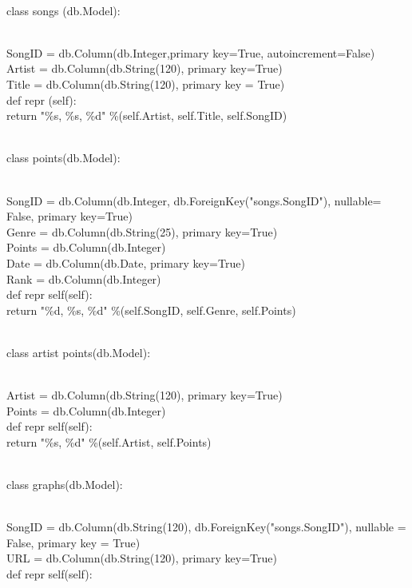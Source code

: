 \documentclass{article}
\begin{document}
\begin{displayquote}
\\ class songs (db.Model):
\begin{displayquote}
\\  SongID = db.Column(db.Integer,primary key=True, autoincrement=False)
\\  Artist = db.Column(db.String(120), primary key=True)
\\  Title = db.Column(db.String(120), primary key = True)
\\  def   repr  (self):
\\    return "\%s, \%s, \%d" \%(self.Artist, self.Title, self.SongID)
\end{displayquote}
\\ class points(db.Model):
\begin{displayquote}
\\  SongID = db.Column(db.Integer, db.ForeignKey("songs.SongID"), nullable= False, primary key=True)
\\  Genre = db.Column(db.String(25), primary key=True)
\\  Points = db.Column(db.Integer)
\\  Date = db.Column(db.Date, primary key=True)
\\  Rank = db.Column(db.Integer)
\\  def   repr  self(self):
\\   return "\%d, \%s, \%d" \%(self.SongID, self.Genre, self.Points)
\end{displayquote}
\\ class artist points(db.Model):
\begin{displayquote}
\\  Artist = db.Column(db.String(120), primary key=True)
\\  Points = db.Column(db.Integer)
\\  def   repr  self(self):
\\   return "\%s, \%d" \%(self.Artist, self.Points)
\end{displayquote}
\\ class graphs(db.Model):
\begin{displayquote}
\\ SongID = db.Column(db.String(120), db.ForeignKey("songs.SongID"), nullable = False, primary key = True)
\\  URL = db.Column(db.String(120), primary key=True)
\\  def   repr  self(self):
\end{displayquote}
\end{displayquote}
\end{document}
